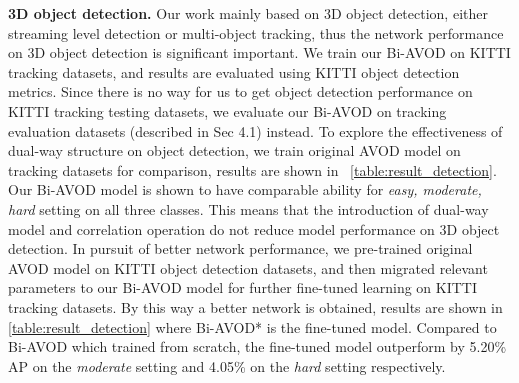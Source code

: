 \documentclass{bmvc2k}
\begin{document}
\textbf{3D object detection.} Our work mainly based on 3D object detection, either streaming level detection or multi-object tracking, thus the network performance on 3D object detection is significant important. We train our Bi-AVOD on KITTI tracking datasets, and results are evaluated using KITTI object detection metrics. Since there is no way for us to get object detection performance on KITTI tracking testing datasets, we evaluate our Bi-AVOD on tracking evaluation datasets (described in Sec 4.1) instead. To explore the effectiveness of dual-way structure on object detection, we train original AVOD model on tracking datasets for comparison, results are shown in \tablename \, \ref{table:result_detection}. Our Bi-AVOD model is shown to have comparable ability for \textit{easy, moderate, hard} setting on all three classes. This means that the introduction of dual-way model and correlation operation do not reduce model performance on 3D object detection. In pursuit of better network performance, we pre-trained original AVOD model on KITTI object detection datasets, and then migrated relevant parameters to our Bi-AVOD model for further fine-tuned learning on KITTI tracking datasets. By this way a better network is obtained, results are shown in \tablename \, \ref{table:result_detection} where Bi-AVOD* is the fine-tuned model. Compared to Bi-AVOD which trained from scratch, the fine-tuned model outperform by 5.20\% AP on the \textit{moderate} setting and 4.05\% on the \textit{hard} setting respectively. 
\end{document}

